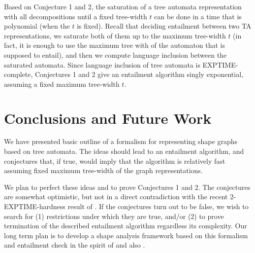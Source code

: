 {Based on Conjecture 1 and 2, the saturation of a tree automata representation with all decompositions until a fixed tree-width $t$ can be done in a time that is polynomial (when the $t$ is fixed).
%
Recall that deciding entailment between two TA representations, we saturate both of them up to the maximum tree-width $t$ (in fact, it is enough to use the maximum tree with of the automaton that is supposed to entail),
and then we compute language inclusion between the saturated automata.
%
Since language inclusion of tree automata is EXPTIME-complete, Conjectures 1 and 2 give an entailment algorithm singly exponential, assuming a fixed maximum tree-width $t$.

\section{Conclusions and Future Work}
We have presented basic outline of a formalism for representing shape graphs based on tree automata. The ideas should lead to an entailment algorithm, and conjectures that, if true, would imply that the algorithm is relatively fast assuming fixed maximum tree-width of the graph representations.

We plan to perfect these ideas and to prove Conjectures 1 and 2. The conjectures are somewhat optimistic, but not in a direct contradiction with the recent 2-EXPTIME-hardness result of \cite{Iosif:LPAR}. If the conjectures turn out to be false, we wish to search for (1) restrictions under which they are true, and/or (2) to prove termination of the described entailment algorithm regardless its complexity.
Our long term plan is to develop a shape analysis framework based on this formalism and entailment check in the spirit of \cite{holik_boxes_2013} and also \cite{locle:secondorder}.

%
%



}
